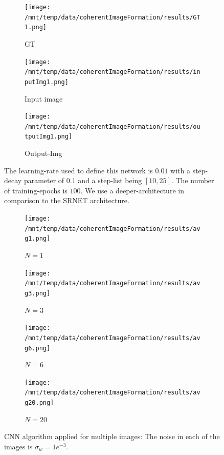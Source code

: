 \documentclass[a4paper, 11pt]{article}
\begin{document}
\begin{figure}[h]
\centering
\begin{subfigure}[b]{0.22\textwidth}
        \texttt{[image: /mnt/temp/data/coherentImageFormation/results/GT1.png]}
        \caption{GT}
        \label{fig:GT}
    \end{subfigure}
    \begin{subfigure}[b]{0.22\textwidth}
        \texttt{[image: /mnt/temp/data/coherentImageFormation/results/inputImg1.png]}
        \caption{Input image}
        \label{fig:inputImg}
    \end{subfigure}
    \begin{subfigure}[b]{0.22\textwidth}
        \texttt{[image: /mnt/temp/data/coherentImageFormation/results/outputImg1.png]}
        \caption{Output-Img}
        \label{fig:outputImg}
    \end{subfigure}
\caption{The learning-rate used to define this network is $0.01$ with a step-decay parameter of $0.1$ and a step-list being $[10, 25]$. The number of training-epochs is $100$. We use a deeper-architecture in comparison to the SRNET architecture.}
\label{fig:outputFig}
\end{figure}

\begin{figure}[h]
\centering
\begin{subfigure}[b]{0.22\textwidth}
        \texttt{[image: /mnt/temp/data/coherentImageFormation/results/avg1.png]}
        \caption{$N = 1$}
        \label{fig:avg1}
    \end{subfigure}
    \begin{subfigure}[b]{0.22\textwidth}
        \texttt{[image: /mnt/temp/data/coherentImageFormation/results/avg3.png]}
        \caption{$N = 3$}
        \label{fig:avg3}
    \end{subfigure}
    \begin{subfigure}[b]{0.22\textwidth}
        \texttt{[image: /mnt/temp/data/coherentImageFormation/results/avg6.png]}
        \caption{$N = 6$}
        \label{fig:avg6}
    \end{subfigure}
    \begin{subfigure}[b]{0.22\textwidth}
        \texttt{[image: /mnt/temp/data/coherentImageFormation/results/avg20.png]}
        \caption{$N = 20$}
        \label{fig:avg20}
    \end{subfigure}
\caption{CNN algorithm applied for multiple images: The noise in each of the images is $\sigma_w=1e^{-3}$.}
\label{fig:avgFig}
\end{figure}
\end{document}
